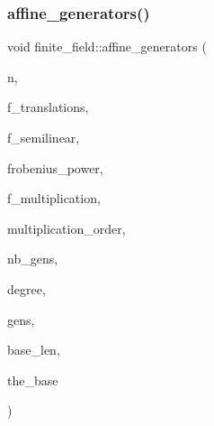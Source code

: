 \mbox{\label{classfinite__field_a512b4b21212d5567d74d54d669381a80}} 
\subsubsection{\texorpdfstring{affine\+\_\+generators()}{affine\_generators()}}
{\footnotesize\ttfamily void finite\+\_\+field\+::affine\+\_\+generators (\begin{DoxyParamCaption}\item[{\mbox{\hyperlink{galois_8h_a09fddde158a3a20bd2dcadb609de11dc}{I\+NT}}}]{n,  }\item[{\mbox{\hyperlink{galois_8h_a09fddde158a3a20bd2dcadb609de11dc}{I\+NT}}}]{f\+\_\+translations,  }\item[{\mbox{\hyperlink{galois_8h_a09fddde158a3a20bd2dcadb609de11dc}{I\+NT}}}]{f\+\_\+semilinear,  }\item[{\mbox{\hyperlink{galois_8h_a09fddde158a3a20bd2dcadb609de11dc}{I\+NT}}}]{frobenius\+\_\+power,  }\item[{\mbox{\hyperlink{galois_8h_a09fddde158a3a20bd2dcadb609de11dc}{I\+NT}}}]{f\+\_\+multiplication,  }\item[{\mbox{\hyperlink{galois_8h_a09fddde158a3a20bd2dcadb609de11dc}{I\+NT}}}]{multiplication\+\_\+order,  }\item[{\mbox{\hyperlink{galois_8h_a09fddde158a3a20bd2dcadb609de11dc}{I\+NT}} \&}]{nb\+\_\+gens,  }\item[{\mbox{\hyperlink{galois_8h_a09fddde158a3a20bd2dcadb609de11dc}{I\+NT}} \&}]{degree,  }\item[{\mbox{\hyperlink{galois_8h_a09fddde158a3a20bd2dcadb609de11dc}{I\+NT}} $\ast$\&}]{gens,  }\item[{\mbox{\hyperlink{galois_8h_a09fddde158a3a20bd2dcadb609de11dc}{I\+NT}} \&}]{base\+\_\+len,  }\item[{\mbox{\hyperlink{galois_8h_a09fddde158a3a20bd2dcadb609de11dc}{I\+NT}} $\ast$\&}]{the\+\_\+base }\end{DoxyParamCaption})}

\mbox{\label{classfinite__field_a3ad98ce41bdaaa88159a6751734cd4c1}} 
